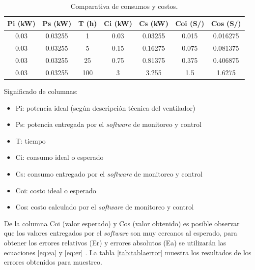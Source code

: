 \begin{table}[h]
	\centering
	\caption[Comparativa de consumos y costos]{Comparativa de consumos y costos.}
	\begin{tabular}{c c c c c c c}    
		\toprule
		\textbf{Pi (kW)} 	 & \textbf{Ps (kW)}  & \textbf{T (h)} &\textbf{Ci (kW)} &\textbf{Cs (kW)} &\textbf{Coi (S/)} &\textbf{Cos (S/)}\\
		\midrule
		0.03 & 0.03255 & 1 & 0.03 & 0.03255 & 0.015 & 0.016275\\		
		0.03 & 0.03255 & 5 & 0.15 & 0.16275 & 0.075 & 0.081375 \\
		0.03 & 0.03255 & 25 & 0.75 & 0.81375 & 0.375 & 0.406875\\		
		0.03 & 0.03255 & 100 & 3 & 3.255 & 1.5 & 1.6275\\		
		
		\bottomrule
		\hline
	\end{tabular}
	\label{tab:tablacostos}
\end{table}

\vspace{0.1cm}
Significado de columnas:
\begin{itemize}
\item Pi: potencia ideal (según descripción técnica del ventilador) 
\item Ps: potencia entregada por el \emph{software} de monitoreo y control
\item T: tiempo
\item Ci: consumo ideal o esperado
\item Cs: consumo entregado por el \emph{software} de monitoreo y control
\item Coi: costo ideal o esperado
\item Cos: costo calculado por el \emph{software} de monitoreo y control
\end{itemize}

\vspace{0.1cm}
De la columna Coi (valor esperado) y Cos (valor obtenido) es posible observar que los valores entregados por el \emph{software} son muy cercanos al esperado, para obtener los errores relativos (Er) y errores absolutos (Ea) se utilizarán las ecuaciones  \ref{eq:ea} y \ref{eq:er} . La tabla \ref{tab:tablaerror} muestra los resultados de los errores obtenidos para muestreo.




